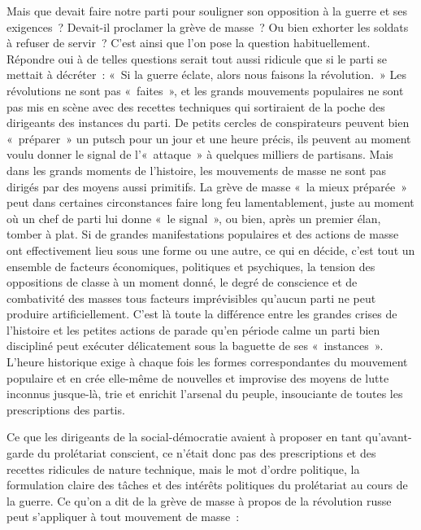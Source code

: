 \documentclass[french,twoside]{book} %
\begin{document}
  Mais que devait faire notre parti pour souligner son opposition à la guerre et ses exigences ? Devait-il proclamer la grève de masse ? Ou bien exhorter les soldats à refuser de servir ? C'est ainsi que l’on pose la question habituellement. Répondre oui à de telles questions serait tout aussi ridicule que si le parti se mettait à décréter : « Si la guerre éclate, alors nous faisons la révolution. » Les révolutions ne sont pas « faites », et les grands mouvements populaires ne sont pas mis en scène avec des recettes techniques qui sortiraient de la poche des dirigeants des instances du parti. De petits cercles de conspirateurs peuvent bien « préparer » un putsch pour un jour et une heure précis, ils peuvent au moment voulu donner le signal de l’« attaque » à quelques milliers de partisans. Mais dans les grands moments de l’histoire, les mouvements de masse ne sont pas dirigés par des moyens aussi primitifs. La grève de masse « la mieux préparée » peut dans certaines circonstances faire long feu lamentablement, juste au moment où un chef de parti lui donne « le signal », ou bien, après un premier élan, tomber à plat. Si de grandes manifestations populaires et des actions de masse ont effectivement lieu sous une forme ou une autre, ce qui en décide, c’est tout un ensemble de facteurs économiques, politiques et psychiques, la tension des oppositions de classe à un moment donné, le degré de conscience et de combativité des masses tous facteurs imprévisibles qu’aucun parti ne peut produire artificiellement. C'est là toute la différence entre les grandes crises de l’histoire et les petites actions de parade qu’en période calme un parti bien discipliné peut exécuter délicatement sous la baguette de ses « instances ». L'heure historique exige à chaque fois les formes correspondantes du mouvement populaire et en crée elle-même de nouvelles et improvise des moyens de lutte inconnus jusque-là, trie et enrichit l’arsenal du peuple, insouciante de toutes les prescriptions des partis.\par
Ce que les dirigeants de la social-démocratie avaient à proposer en tant qu’avant-garde du prolétariat conscient, ce n’était donc pas des prescriptions et des recettes ridicules de nature technique, mais le mot d’ordre politique, la formulation claire des tâches et des intérêts politiques du prolétariat au cours de la guerre. Ce qu’on a dit de la grève de masse à propos de la révolution russe peut s’appliquer à tout mouvement de masse :\par
\end{document}
